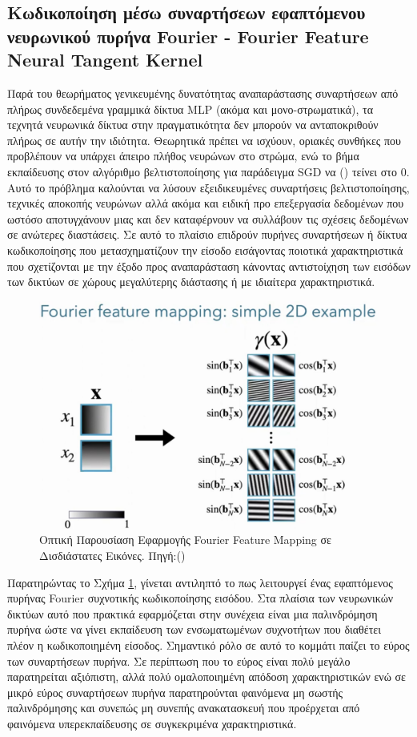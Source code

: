 \subsection{Κωδικοποίηση μέσω συναρτήσεων εφαπτόμενου νευρωνικού πυρήνα Fourier - Fourier Feature Neural Tangent Kernel}
\par
    Παρά του θεωρήματος γενικευμένης δυνατότητας αναπαράστασης συναρτήσεων από πλήρως συνδεδεμένα γραμμικά δίκτυα MLP (ακόμα και μονο-στρωματικά), τα τεχνητά νευρωνικά δίκτυα στην πραγματικότητα δεν μπορούν να ανταποκριθούν πλήρως σε αυτήν την ιδιότητα. Θεωρητικά πρέπει να ισχύουν, οριακές συνθήκες που προβλέπουν να υπάρχει άπειρο πλήθος νευρώνων στο στρώμα, ενώ το βήμα εκπαίδευσης στον αλγόριθμο βελτιστοποίησης για παράδειγμα SGD να () τείνει στο 0. Αυτό το πρόβλημα καλούνται να λύσουν εξειδικευμένες συναρτήσεις βελτιστοποίησης, τεχνικές αποκοπής νευρώνων αλλά ακόμα και ειδική προ επεξεργασία δεδομένων που ωστόσο αποτυγχάνουν μιας και δεν καταφέρνουν να συλλάβουν τις σχέσεις δεδομένων σε ανώτερες διαστάσεις. Σε αυτό το πλαίσιο επιδρούν πυρήνες συναρτήσεων ή δίκτυα κωδικοποίησης που μετασχηματίζουν την είσοδο εισάγοντας ποιοτικά χαρακτηριστικά που σχετίζονται με την έξοδο προς αναπαράσταση κάνοντας αντιστοίχηση των εισόδων των δικτύων σε χώρους μεγαλύτερης διάστασης ή με ιδιαίτερα χαρακτηριστικά. 
    \begin{figure}[ht]
        \centering
        \includegraphics[width=.4\linewidth]{images/chapter2_img/FourierMapping.jpg}
        \caption{Οπτική Παρουσίαση Εφαρμογής Fourier Feature Mapping σε Δισδιάστατες Εικόνες. Πηγή:(\cite{tancik2020fourier})}
        \label{fig:2dfouriermapping}
    \end{figure}
\par
    Παρατηρώντας το Σχήμα \ref{fig:2dfouriermapping}, γίνεται αντιληπτό το πως λειτουργεί ένας εφαπτόμενος πυρήνας Fourier συχνοτικής κωδικοποίησης εισόδου. Στα πλαίσια των νευρωνικών δικτύων αυτό που πρακτικά εφαρμόζεται στην συνέχεια είναι μια παλινδρόμηση πυρήνα ώστε να γίνει εκπαίδευση των ενσωματωμένων συχνοτήτων που διαθέτει πλέον η κωδικοποιημένη είσοδος. Σημαντικό ρόλο σε αυτό το κομμάτι παίζει το εύρος των συναρτήσεων πυρήνα. Σε περίπτωση που το εύρος είναι πολύ μεγάλο παρατηρείται αξιόπιστη, αλλά πολύ ομαλοποιημένη απόδοση χαρακτηριστικών ενώ σε μικρό εύρος συναρτήσεων πυρήνα παρατηρούνται φαινόμενα μη σωστής παλινδρόμησης και συνεπώς μη συνεπής ανακατασκευή που προέρχεται από φαινόμενα υπερεκπαίδευσης σε συγκεκριμένα χαρακτηριστικά.
